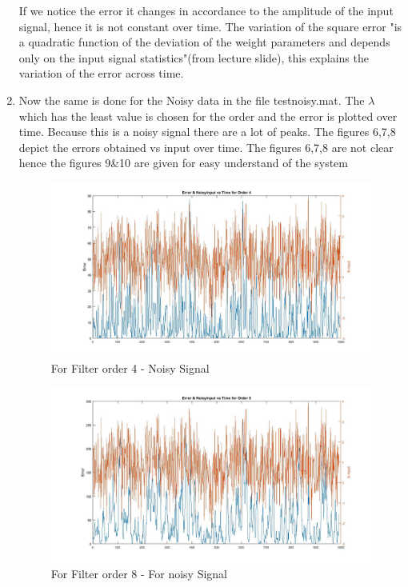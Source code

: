 \documentclass[10pt, letterpaper]{article}
\begin{document}
\begin{enumerate}
If we notice the error it changes in accordance to the amplitude of the input signal, hence it is not constant over time. The variation of the square error "is a quadratic function of the deviation of the weight parameters and depends only on the input signal statistics"(from lecture slide), this explains the variation of the error across time.
 
 
 \item Now the same is done for the Noisy data in the file testnoisy.mat. The $\lambda$ which has the least value is chosen for the order and the error is plotted over time. Because this is a noisy signal there are a lot of peaks. The figures 6,7,8 depict the errors obtained vs input over time. The figures 6,7,8 are not clear hence the figures 9\&10 are given for easy understand of the system
\begin{figure}
\centering
\label{fig:four1}
\caption{For Filter order 4 - Noisy Signal}
\includegraphics[scale=0.25]{MSE1_Noisy}
\end{figure}
\begin{figure}
\centering
\label{fig:eight1}
\caption{For Filter order 8 - For noisy Signal}
\includegraphics[scale=0.25]{MSE2_Noisy}

\end{figure}
\end{enumerate}
\end{document}
